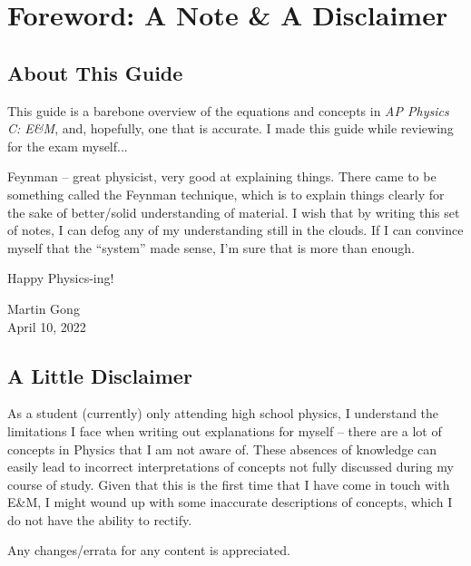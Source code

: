 \chapter{Foreword: A Note \& A Disclaimer}

\section{About This Guide} 

This guide is a barebone overview of the equations and concepts in \textit{AP Physics C: E\&M}, and, hopefully, one that is accurate. I made this guide while reviewing for the exam myself...

Feynman -- great physicist, very good at explaining things. There came to be something called the Feynman technique, which is to explain things clearly for the sake of better/solid understanding of material. I wish that by writing this set of notes, I can defog any of my understanding still in the clouds. If I can convince myself that the ``system'' made sense, I'm sure that is more than enough.

Happy Physics-ing!

\begin{flushright}
    Martin Gong\\
    April 10, 2022
\end{flushright}

\section{A Little Disclaimer}

As a student (currently) only attending high school physics, I understand the limitations I face when writing out explanations for myself -- there are a lot of concepts in Physics that I am not aware of. These absences of knowledge can easily lead to incorrect interpretations of concepts not fully discussed during my course of study. Given that this is the first time that I have come in touch with E\&M, I might wound up with some inaccurate descriptions of concepts, which I do not have the ability to rectify.

Any changes/errata for any content is appreciated.

\bigskip


